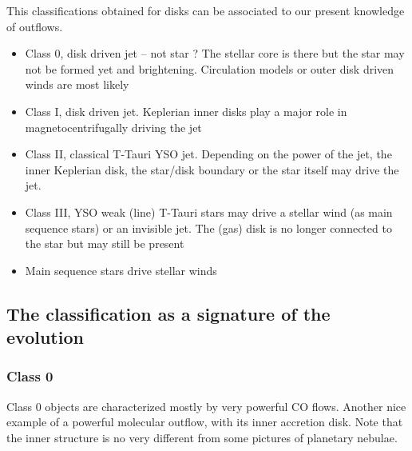 \documentclass[10pt,a4paper,english]{article}
\begin{document}
This classifications obtained for disks can be associated to our present
knowledge of outflows.
\begin{itemize}
    \item Class 0, disk driven jet -- not star ? The stellar core is there but
          the star may not be formed yet and brightening. Circulation models or
          outer disk driven winds are most likely
    \item Class I, disk driven jet. Keplerian inner disks play a major role in
          magnetocentrifugally driving the jet
    \item Class II, classical T-Tauri YSO jet. Depending on the power of the
          jet, the inner Keplerian disk, the star/disk boundary or the star
          itself may drive the jet.
    \item Class III, YSO weak (line) T-Tauri stars may drive a stellar wind (as
          main sequence stars) or an invisible jet. The (gas) disk is no longer
          connected to the star but may still be present
    \item Main sequence stars drive stellar winds
\end{itemize}

\subsection{The classification as a signature of the evolution}

\subsubsection{Class 0}

Class 0 objects are characterized mostly by very powerful CO flows. Another
nice example of a powerful molecular outflow, with its inner accretion disk.
Note that the inner structure is no very different from some pictures of
planetary nebulae.
\end{document}
